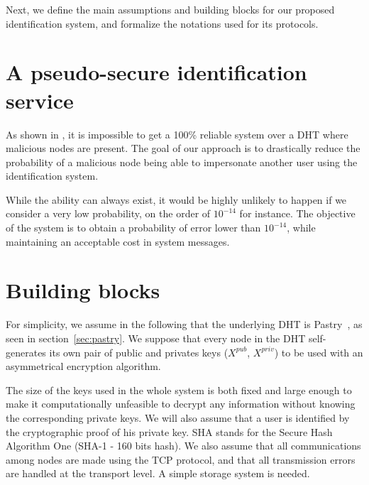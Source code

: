 Next, we define the main assumptions and building blocks for our proposed
identification system, and formalize the notations used for its protocols.


\section{A pseudo-secure identification service}
\label{sec:pseudo-secure}
As shown in \cite{the_sybil_attack}, it is impossible to get a 100\% reliable
system over a DHT where malicious nodes are present. The goal of our approach
is to drastically reduce the probability of a malicious node being able to impersonate
another user using the identification system.

While the ability can always exist, it would be highly unlikely to happen
if we consider a very low probability, on the order of $10^{-14}$ for instance. The objective of 
the system is to obtain a probability of error lower than $10^{-14}$, while
maintaining an acceptable cost in system messages.

\section{Building blocks}
\label{sec:building_blocks}

For simplicity, we assume in the following that the underlying DHT is
Pastry~\cite{pastry}, as seen in section~\ref{sec:pastry}. We suppose that
every node in the DHT self-generates its own pair of public and privates keys
($X^{pub}$, $X^{priv}$) to be used with an asymmetrical encryption
algorithm.%

 The size of the keys used in the whole system is both fixed and large enough to make it computationally
unfeasible to decrypt any information without knowing the corresponding private
keys. We will also assume that a user is identified by the cryptographic proof of
his private key. SHA stands for the Secure Hash Algorithm One (SHA-1 - 160 bits hash). We also
assume that all communications among nodes are made using the TCP protocol, and
that all transmission errors are handled at the transport level.
A simple storage system is needed.


